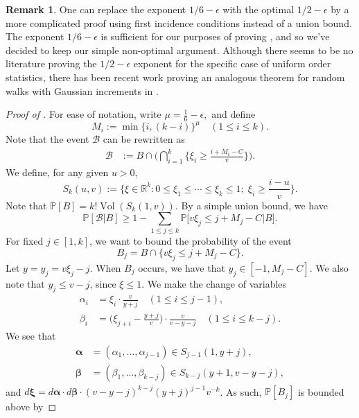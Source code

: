 \documentclass{amsart}
\theoremstyle{definition}
\newtheorem*{remark}{Remark}
\numberwithin{equation}{section}
\newcommand{\R}{\mathbb{R}}
\renewcommand{\P}{\mathbb{P}}
\DeclareMathOperator{\Vol}{Vol}
\begin{document}
\begin{remark}
	One can replace the exponent $1/6-\epsilon$ with the optimal $1/2-\epsilon$ by a more complicated proof using first incidence conditions instead of a union bound. The exponent $1/6-\epsilon$ is sufficient for our purposes of proving , and so we've decided to keep our simple non-optimal argument. Although there seems to be no literature proving the $1/2-\epsilon$ exponent for the specific case of uniform order statistics, there has been recent work proving an analogous theorem for random walks with Gaussian increments in \cite[Appendix B]{arguin2020fyodorov}.
\end{remark}

\begin{proof}[Proof of ]
For ease of notation, write $\mu = \frac{1}{6}-\epsilon,$ and define $$M_i := \min \{i , (k-i)\}^{\mu} \quad (1 \leq i \leq k).$$ Note that the event $\mathscr{B}$ can be rewritten as
	\begin{align*}
		\mathscr{B} &:= B \cap \bigg( \bigcap_{i = 1}^k\Big\{ \xi_i \geq \frac{i+M_i-C}{v}\Big\}\bigg).
	\end{align*}
	We define, for any given $u > 0$,
	$$S_k(u,v) := \Big\{\xi \in \R^k : 0 \leq \xi_1 \leq \cdots \leq \xi_k \leq 1;\; \xi_i \geq \frac{i-u}{v}\Big\}.$$
	Note that $\P[B] = k!\Vol(S_k(1,v))$. By a simple union bound, we have
	\begin{equation}\label{bettersmirnov eq 0}
		\P[\mathscr{B} | B] \geq 1 - \sum_{1 \leq j \leq k}\P\big[v\xi_j \leq j + M_j - C \big| B\big].
	\end{equation}
	For fixed $j \in [1,k]$, we want to bound the probability of the event $$B_j=B\cap \{v\xi_j\le j+M_j-C\}.$$ Let $y = y_j = v \xi_j - j.$ When $B_j$ occurs, we have that $y_j\in[-1,M_j-C]$. We also note that $y_j \leq v-j$, since $\xi \leq 1$. We make the change of variables
	\begin{align*}
		\alpha_i &= \xi_i \cdot \frac{v}{y+j} \quad (1 \leq i \leq j-1),\\
		\beta_i &= \bigg( \xi_{j+i} - \frac{y+j}{v} \bigg) \cdot \frac{v}{v-y-j} \quad (1 \leq i \leq k-j).
	\end{align*}
	We see that
	\begin{align*}
		\bm{\alpha} &= (\alpha_1, \dots, \alpha_{j-1}) \in S_{j-1}(1,y+j),\\
		\bm{\beta} &= (\beta_1,\dots,\beta_{k-j}) \in S_{k-j}(y+1,v-y-j),
	\end{align*}
	and $d\bm{\xi} = d\bm{\alpha} \cdot d\bm{\beta} \cdot (v-y-j)^{k-j}(y+j)^{j-1} v^{-k}$. As such, $\P[B_j]$ is bounded above by

\end{proof}
\end{document}
